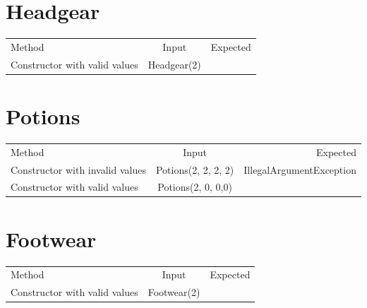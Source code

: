 \documentclass[12pt]{amsart}
\begin{document}
\section{Headgear}

\begin{table}[htbp]
   \begin{tabular}{@{} lcr @{}} %

      Method      & Input & Expected \\
         Constructor with valid values       & Headgear(2)      &   \\
    \end{tabular}
\end{table}

\section{Potions}

\begin{table}[htbp]
   \begin{tabular}{@{} lcr @{}} %

      Method      & Input & Expected \\
         Constructor with invalid values       & Potions(2, 2, 2, 2)     &  IllegalArgumentException \\
         Constructor with valid values       & Potions(2, 0, 0,0)      &   \\
    \end{tabular}
\end{table}

\section{Footwear}

\begin{table}[htbp]
   \begin{tabular}{@{} lcr @{}} %

      Method      & Input & Expected \\
         Constructor with valid values       & Footwear(2)     &   \\
    \end{tabular}
\end{table}
\end{document}
